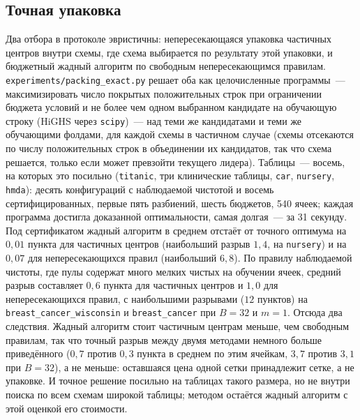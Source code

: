 \documentclass[11pt]{article}
\begin{document}
\begin{table}[t]\centering\small\setlength{\tabcolsep}{3.5pt}
\caption{Сертифицированное сравнение на тех же порогах, $B=32$, каждая конфигурация со своим порогом размера $m$ («свой»); столбцы как в таблице~\ref{tab:grid}. Получено \texttt{experiments/paper\_tables.py} из \texttt{pairwise\_grid\_certified.csv}.}\label{tab:gridcert}

\end{table}

\subsection{Точная упаковка}\label{sec:packing}
Два отбора в протоколе эвристичны: непересекающаяся упаковка частичных центров внутри схемы, где схема выбирается по результату этой упаковки, и бюджетный жадный алгоритм по свободным непересекающимся правилам. \texttt{experiments/packing\_exact.py} решает оба как целочисленные программы~--- максимизировать число покрытых положительных строк при ограничении бюджета условий и не более чем одном выбранном кандидате на обучающую строку (HiGHS через \texttt{scipy})~--- над теми же кандидатами и теми же обучающими фолдами, для каждой схемы в частичном случае (схемы отсекаются по числу положительных строк в объединении их кандидатов, так что схема решается, только если может превзойти текущего лидера). Таблицы~--- восемь, на которых это посильно (\texttt{titanic}, три клинические таблицы, \texttt{car}, \texttt{nursery}, \texttt{hmda}): десять конфигураций с наблюдаемой чистотой и восемь сертифицированных, первые пять разбиений, шесть бюджетов, 540 ячеек; каждая программа достигла доказанной оптимальности, самая долгая~--- за 31 секунду. Под сертификатом жадный алгоритм в среднем отстаёт от точного оптимума на $0{,}01$ пункта для частичных центров (наибольший разрыв $1{,}4$, на \texttt{nursery}) и на $0{,}07$ для непересекающихся правил (наибольший $6{,}8$). По правилу наблюдаемой чистоты, где пулы содержат много мелких чистых на обучении ячеек, средний разрыв составляет $0{,}6$ пункта для частичных центров и $1{,}0$ для непересекающихся правил, с наибольшими разрывами ($12$ пунктов) на \texttt{breast\_cancer\_wisconsin} и \texttt{breast\_cancer} при $B=32$ и $m=1$. Отсюда два следствия. Жадный алгоритм стоит частичным центрам меньше, чем свободным правилам, так что точный разрыв между двумя методами немного больше приведённого ($0{,}7$ против $0{,}3$ пункта в среднем по этим ячейкам, $3{,}7$ против $3{,}1$ при $B=32$), а не меньше: оставшаяся цена одной сетки принадлежит сетке, а не упаковке. И точное решение посильно на таблицах такого размера, но не внутри поиска по всем схемам широкой таблицы; методом остаётся жадный алгоритм с этой оценкой его стоимости.
\end{document}
